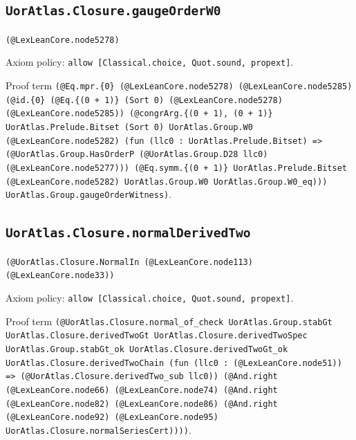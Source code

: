 \documentclass[11pt]{article}
\begin{document}
\subsection*{\texttt{UorAtlas.Closure.gaugeOrderW0}}
\noindent\texttt{(@LexLeanCore.node5278)}\par
\noindent Axiom policy: \texttt{allow [Classical.choice, Quot.sound, propext]}.\par
\noindent Proof term \texttt{(@Eq.mpr.\{0\} (@LexLeanCore.node5278) (@LexLeanCore.node5285) (@id.\{0\} (@Eq.\{(0 + 1)\} (Sort 0) (@LexLeanCore.node5278) (@LexLeanCore.node5285)) (@congrArg.\{(0 + 1), (0 + 1)\} UorAtlas.Prelude.Bitset (Sort 0) UorAtlas.Group.W0 (@LexLeanCore.node5282) (fun (llc0 : UorAtlas.Prelude.Bitset) => (@UorAtlas.Group.HasOrderP (@UorAtlas.Group.D28 llc0) (@LexLeanCore.node5277))) (@Eq.symm.\{(0 + 1)\} UorAtlas.Prelude.Bitset (@LexLeanCore.node5282) UorAtlas.Group.W0 UorAtlas.Group.W0\_eq))) UorAtlas.Group.gaugeOrderWitness)}.\par
\subsection*{\texttt{UorAtlas.Closure.normalDerivedTwo}}
\noindent\texttt{(@UorAtlas.Closure.NormalIn (@LexLeanCore.node113) (@LexLeanCore.node33))}\par
\noindent Axiom policy: \texttt{allow [Classical.choice, Quot.sound, propext]}.\par
\noindent Proof term \texttt{(@UorAtlas.Closure.normal\_of\_check UorAtlas.Group.stabGt UorAtlas.Closure.derivedTwoGt UorAtlas.Closure.derivedTwoSpec UorAtlas.Group.stabGt\_ok UorAtlas.Closure.derivedTwoGt\_ok UorAtlas.Closure.derivedTwoChain (fun (llc0 : (@LexLeanCore.node51)) => (@UorAtlas.Closure.derivedTwo\_sub llc0)) (@And.right (@LexLeanCore.node66) (@LexLeanCore.node74) (@And.right (@LexLeanCore.node82) (@LexLeanCore.node86) (@And.right (@LexLeanCore.node92) (@LexLeanCore.node95) UorAtlas.Closure.normalSeriesCert))))}.\par
\end{document}
